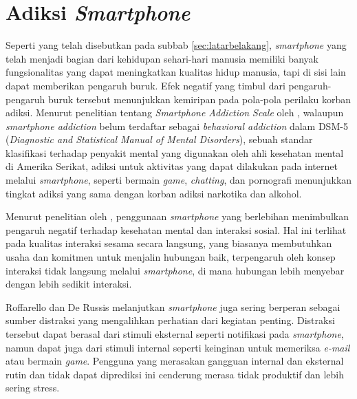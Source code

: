\section{Adiksi \textit{Smartphone}}
Seperti yang telah disebutkan pada subbab \ref{sec:latarbelakang}, \textit{smartphone} yang telah menjadi bagian dari kehidupan sehari-hari manusia memiliki banyak fungsionalitas yang dapat meningkatkan kualitas hidup manusia, tapi di sisi lain dapat memberikan pengaruh buruk. Efek negatif yang timbul dari pengaruh-pengaruh buruk tersebut menunjukkan kemiripan pada pola-pola perilaku korban adiksi. Menurut penelitian tentang \textit{Smartphone Addiction Scale} oleh \textcite{10.1371/journal.pone.0083558}, walaupun \textit{smartphone addiction} belum terdaftar sebagai \textit{behavioral addiction} dalam DSM-5 (\textit{Diagnostic and Statistical Manual of Mental Disorders}), sebuah standar klasifikasi terhadap penyakit mental yang digunakan oleh ahli kesehatan mental di Amerika Serikat, adiksi untuk aktivitas yang dapat dilakukan pada internet melalui \textit{smartphone}, seperti bermain \textit{game}, \textit{chatting}, dan pornografi menunjukkan tingkat adiksi yang sama dengan korban adiksi narkotika dan alkohol.

Menurut penelitian oleh \textcite{CHI2019SOCIALIZE}, penggunaan \textit{smartphone} yang berlebihan menimbulkan pengaruh negatif terhadap kesehatan mental dan interaksi sosial. Hal ini terlihat pada kualitas interaksi sesama secara langsung, yang biasanya membutuhkan usaha dan komitmen untuk menjalin hubungan baik, terpengaruh oleh konsep interaksi tidak langsung melalui \textit{smartphone}, di mana hubungan lebih menyebar dengan lebih sedikit interaksi.

Roffarello dan De Russis melanjutkan \textit{smartphone} juga sering berperan sebagai sumber distraksi yang mengalihkan perhatian dari kegiatan penting. Distraksi tersebut dapat berasal dari stimuli eksternal seperti notifikasi pada \textit{smartphone}, namun dapat juga dari stimuli internal seperti keinginan untuk memeriksa \textit{e-mail} atau bermain \textit{game}. Pengguna yang merasakan gangguan internal dan eksternal rutin dan tidak dapat diprediksi ini cenderung merasa tidak produktif dan lebih sering stress.
